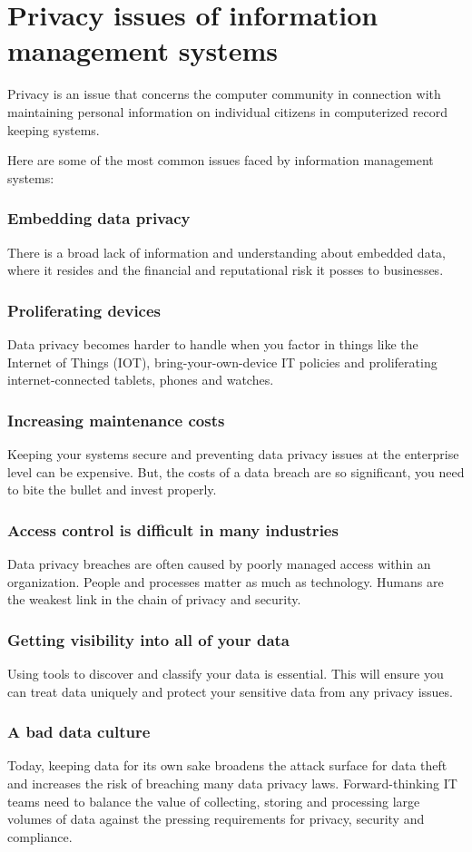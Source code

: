 \documentclass[12pt, a4paper]{article}
\begin{document}
\section{Privacy issues of information management systems}%
Privacy is an issue that concerns the computer community in connection with
maintaining personal information on individual citizens in computerized record
keeping systems.

Here are some of the most common issues faced by information management
systems:
\subsubsection{Embedding data privacy}
There is a broad lack of information and understanding about embedded
data, where it resides and the financial and reputational risk it posses
to businesses.
\subsubsection{Proliferating devices}
Data privacy becomes harder to handle when you factor in things like the
Internet of Things (IOT), bring-your-own-device IT policies and proliferating
internet-connected tablets, phones and watches.
\subsubsection{Increasing maintenance costs}
Keeping your systems secure and preventing data privacy issues at the
enterprise level can be expensive. But, the costs of a data breach are so
significant, you need to bite the bullet and invest properly.
\subsubsection{Access control is difficult in many industries}
Data privacy breaches are often caused by poorly managed access within an
organization. People and processes matter as much as technology. Humans are
the weakest link in the chain of privacy and security.
\subsubsection{Getting visibility into all of your data}
Using tools to discover and classify your data is essential. This will ensure
you can treat data uniquely and protect your sensitive data from any privacy
issues.
\subsubsection{A bad data culture}
Today, keeping data for its own sake broadens the attack surface for data
theft and increases the risk of breaching many data privacy laws.
Forward-thinking IT teams need to balance the value of collecting, storing and
processing large volumes of data against the pressing requirements for
privacy, security and compliance.
\end{document}
